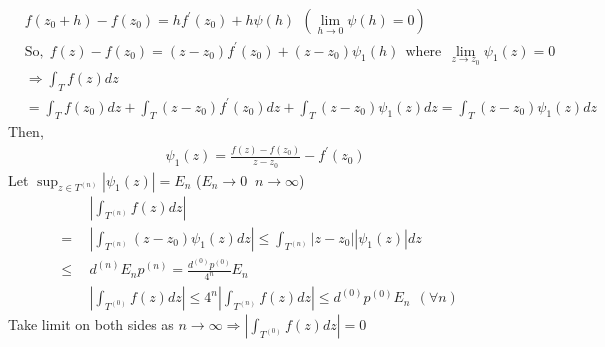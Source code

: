 \documentclass{article}
\begin{document}
\begin{flushleft}
\begin{equation*}
\begin{split}    
&f(z_0+h)-f(z_0)=hf^{'}(z_0)+h\psi(h) \:\:(\lim_{h \to 0}\psi(h)=0)\\
&\text{So,}\:\: f(z)-f(z_0)=(z-z_0)f^{'}(z_0) + (z-z_0)\psi_1(h)\:\: \text{where}\:\: \lim_{z \to z_0}\psi_1(z)=0
\end{split}
\end{equation*}
\begin{equation*}
\begin{split}    
&\Rightarrow \int_{T}^{} f(z) dz\\
&= \int_{T}^{} f(z_0) dz + \int_{T}^{} (z-z_0)f^{'}(z_0) dz + \int_{T}^{} (z-z_0)\psi_1(z) dz= \int_{T}^{} (z-z_0)\psi_1(z) dz
\end{split}
\end{equation*}
Then, 
\begin{equation*}
\begin{split}
&\psi_1(z)= \frac{f(z)-f(z_0)}{z-z_0}-f^{'}(z_0) 
\end{split}
\end{equation*}
Let  $\sup_{z\in T^{(n)}}|\psi_1(z)|= E_n$ ($E_n\rightarrow 0\:$ \: $n \rightarrow \infty$) 
\begin{equation*}
\begin{split}
&|\int_{T^{(n)}}^{} f(z) dz|\\
=\:\:&|\int_{T^{(n)}}^{} (z-z_0)\psi_1(z) dz|\leq \int_{T^{(n)}}^{} |z-z_0||\psi_1(z)| dz \\
\leq\:\:& d^{(n)}E_np^{(n)}=\frac{d^{(0)}p^{(0)}}{4^n}E_n \\
&|\int_{T^{(0)}}^{} f(z) dz|\leq 4^n|\int_{T^{(n)}}^{} f(z) dz|\leq d^{(0)}p^{(0)}E_n\:\: (\forall n)
\end{split}
\end{equation*}
Take limit on both sides as $n\rightarrow \infty\Rightarrow |\int_{T^{(0)}}^{} f(z) dz|=0$ \\
\clearpage

\end{flushleft}
\end{document}
